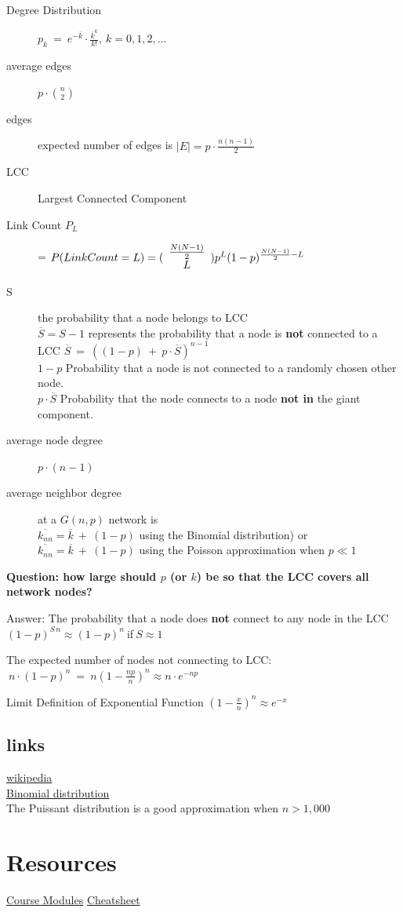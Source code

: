 \documentclass{article}
\begin{document}
\begin{description}
    \item [Degree Distribution]  $p_k\:=\:e^{-\overline{k}}\cdot{\frac{\overline{k}^{k}}{k!}},\:k=0,1,2,\dots$
    \item [average edges] $p\cdot{\binom{n}{2}}$
    \item [edges] expected number of edges is  $|E|=p\cdot\frac{n(n-1)}{2}$
    \item[LCC] Largest Connected Component
    \item[Link Count $P_L$] = $ P(Link Count = L) =( {\begin{array}{*{20}c} {\frac{{N(N - 1)}}{2}}  \\ L  \\ \end{array}} )p^L (1 - p)^{\frac{{N(N - 1)}}{2} - L}$
    \item [S] the probability that a node belongs to LCC\\
    $\overline{S} = S-1$ represents the probability that a node is \textbf{not} connected to a LCC
    $\overline{S}\:=\:((1-p)\:+\:p\cdot\overline{S})^{n-1}$\\
    $1-p$   Probability that a node is not connected to a randomly chosen other node.\\
    $p\cdot\overline{S}$ Probability that the node connects to a node \textbf{not in} the giant component. 
    \item [average node degree] $p\cdot(n-1)$
    \item [average neighbor degree] at a $G(n,p)$ network is\\
    $\overline{k_{nn}}=\overline{k}\:+\:(1-p)$ using the Binomial distribution) or\\
    $\overline{k_{nn}}=\overline{k}\:+\:(1-p)$ using the Poisson approximation when $p\ll1$
\end{description}
\textbf{Question: how large should $p$ (or $k$) be so that the LCC covers all network nodes?  }

Answer: The probability that a node does \textbf{not} connect to any node in the LCC $\left(1-p\right)^{S \, n}\approx\left(1-p\right)^n\:$if$\:S\approx1$

The expected number of nodes not connecting to LCC:
$\:n\cdot\left(1-p\right)^n\:=\:n\left(1-\frac{np}{n}\right)^n\approx n\cdot e^{-np}$

Limit Definition of Exponential Function $\left(1-\frac{x}{n}\right)^n\approx e^{-x}$
\subsection{links}
\href{https://en.wikipedia.org/wiki/Erd%C5%91s%E2%80%93R%C3%A9nyi_model}{wikipedia}\\
\href{https://en.wikipedia.org/wiki/Binomial_distribution}{Binomial distribution}\\
The Puissant distribution is a good approximation when $n>1,000$

\section{Resources}
\href{https://gatech.instructure.com/courses/433540/modules}{Course Modules}
\href{https://cazabetremy.fr/Teaching/CN2021/CheatSheet/CN_CS_introduction.pdf}{Cheatsheet}
\end{document}
